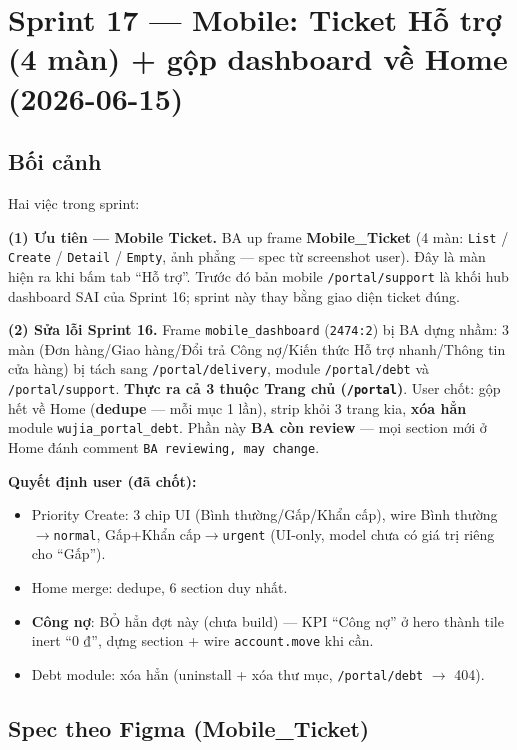 \chapter{Sprint 17 --- Mobile: Ticket Hỗ trợ (4 màn) + gộp dashboard về Home (2026-06-15)}

\section{Bối cảnh}

Hai việc trong sprint:

\textbf{(1) Ưu tiên --- Mobile Ticket.} BA up frame \textbf{Mobile\_Ticket} (4 màn:
\texttt{List} / \texttt{Create} / \texttt{Detail} / \texttt{Empty}, ảnh phẳng --- spec
từ screenshot user). Đây là màn hiện ra khi bấm tab ``Hỗ trợ''. Trước đó bản mobile
\texttt{/portal/support} là khối hub dashboard SAI của Sprint 16; sprint này thay bằng
giao diện ticket đúng.

\textbf{(2) Sửa lỗi Sprint 16.} Frame \texttt{mobile\_dashboard} (\texttt{2474:2}) bị BA
dựng nhầm: 3 màn (Đơn hàng/Giao hàng/Đổi trả \textbullet{} Công nợ/Kiến thức \textbullet{}
Hỗ trợ nhanh/Thông tin cửa hàng) bị tách sang \texttt{/portal/delivery}, module
\texttt{/portal/debt} và \texttt{/portal/support}. \textbf{Thực ra cả 3 thuộc Trang chủ
(\texttt{/portal})}. User chốt: gộp hết về Home (\textbf{dedupe} --- mỗi mục 1 lần),
strip khỏi 3 trang kia, \textbf{xóa hẳn} module \texttt{wujia\_portal\_debt}. Phần này
\textbf{BA còn review} --- mọi section mới ở Home đánh comment \texttt{BA reviewing, may
change}.

\textbf{Quyết định user (đã chốt):}
\begin{itemize}
  \item Priority Create: 3 chip UI (Bình thường/Gấp/Khẩn cấp), wire Bình
        thường\(\rightarrow\)\texttt{normal}, Gấp+Khẩn cấp\(\rightarrow\)\texttt{urgent}
        (UI-only, model chưa có giá trị riêng cho ``Gấp'').
  \item Home merge: dedupe, 6 section duy nhất.
  \item \textbf{Công nợ}: BỎ hẳn đợt này (chưa build) --- KPI ``Công nợ'' ở hero thành
        tile inert ``0 ₫'', dựng section + wire \texttt{account.move} khi cần.
  \item Debt module: xóa hẳn (uninstall + xóa thư mục, \texttt{/portal/debt}
        \(\rightarrow\) 404).
\end{itemize}

\section{Spec theo Figma (Mobile\_Ticket)}

